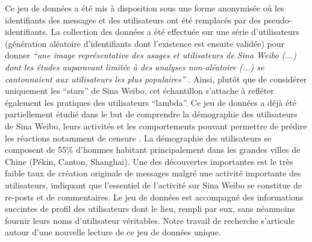 Ce jeu de donn\'ees a \'et\'e mis \`a disposition sous une forme
anonymis\'ee o\`u les identifiants des messages et des utilisateurs ont
\'et\'e remplac\'es par des pseudo-identifiants. La collection des
donn\'ees a \'et\'e effectu\'ee sur une s\'erie
d{\textquoteright}utilisateurs (g\'en\'eration al\'eatoire
d{\textquoteright}identifiants dont l{\textquoteright}existence est
ensuite valid\'ee) pour donner \textit{{\textquotedblleft}une image
repr\'esentative des usages et utilisateurs de Sina Weibo (...) dont
les \'etudes auparavant limit\'ee \`a des analyses non-al\'eatoire
(...) se cantonnaient aux utilisateurs les plus
populaires{\textquotedblright} }\cite{Fu2013}. Ainsi, plut\^ot que
de consid\'erer uniquement les
{\textquotedblleft}stars{\textquotedblright} de Sina Weibo, cet
\'echantillon s{\textquoteright}attache \`a refl\'eter \'egalement les
pratiques des utilisateurs
{\textquotedblleft}lambda{\textquotedblright}. Ce jeu de donn\'ees a
d\'ej\`a \'et\'e partiellement \'etudi\'e dans le but de comprendre la
d\'emographie des utilisateurs de Sina Weibo, leurs activit\'es et les
comportements pouvant permettre de pr\'edire les r\'eactions notamment
de censure \cite{Fu2013}. La d\'emographie des utilisateurs se
composent de 55\% d{\textquoteright}hommes habitant principalement dans
les grandes villes de Chine (P\'ekin, Canton, Shanghai). Une des
d\'ecouvertes importantes est le tr\`es faible taux de cr\'eation
originale de messages malgr\'e une activit\'e importante des
utilisateurs, indiquant que l{\textquoteright}essentiel de
l{\textquoteright}activit\'e sur Sina Weibo se constitue de re-posts et
de commentaires. Le jeu de donn\'ees est accompagn\'e des informations
succintes de profil des utilisateurs dont le lieu, rempli par eux, sans
n\'eanmoins fournir leurs noms d{\textquoteright}utilisateur
v\'eritables. Notre travail de recherche s{\textquoteright}articule
autour d{\textquoteright}une nouvelle lecture de ce jeu de donn\'ees
unique.

